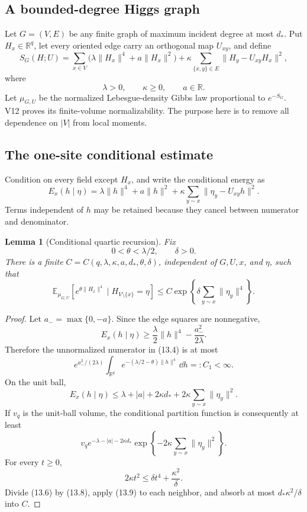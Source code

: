 \documentclass[11pt]{article}
\newtheorem{lemma}[theorem]{Lemma}
\theoremstyle{remark}
\begin{document}
\subsection{A bounded-degree Higgs graph}

Let \(G=(V,E)\) be any finite graph of maximum incident degree at
most \(d_*\).  Put \(H_x\in\mathbb R^q\), let every oriented edge
carry an orthogonal map \(U_{xy}\), and define
\[
 S_G(H;U)
 =\sum_{x\in V}\bigl(\lambda\|H_x\|^4+a\|H_x\|^2\bigr)
 +\kappa\sum_{\{x,y\}\in E}
 \|H_y-U_{xy}H_x\|^2,                             \tag{13.1}
\]
where
\[
 \lambda>0,\qquad \kappa\geq0,\qquad a\in\mathbb R. \tag{13.2}
\]
Let \(\mu_{G,U}\) be the normalized Lebesgue-density Gibbs law
proportional to \(e^{-S_G}\).  V12 proves its finite-volume
normalizability.  The purpose here is to remove all dependence on
\(|V|\) from local moments.

\subsection{The one-site conditional estimate}

Condition on every field except \(H_x\), and write the conditional
energy as
\[
 E_x(h\mid\eta)
 =\lambda\|h\|^4+a\|h\|^2
 +\kappa\sum_{y\sim x}\|\eta_y-U_{xy}h\|^2.        \tag{13.3}
\]
Terms independent of \(h\) may be retained because they cancel
between numerator and denominator.

\begin{lemma}[Conditional quartic recursion]
\label{lem:v17v13-conditional}
Fix
\[
 0<\theta<\lambda/2,\qquad \delta>0.
\]
There is a finite
\(C=C(q,\lambda,\kappa,a,d_*,\theta,\delta)\), independent of
\(G,U,x\), and \(\eta\), such that
\[
 \mathbb E_{\mu_{G,U}}
 \left[e^{\theta\|H_x\|^4}\mid H_{V\setminus\{x\}}=\eta\right]
 \leq
 C\exp\left\{\delta\sum_{y\sim x}\|\eta_y\|^4\right\}.             \tag{13.4}
\]
\end{lemma}

\begin{proof}
Let \(a_-=\max\{0,-a\}\).  Since the edge squares are nonnegative,
\[
 E_x(h\mid\eta)
 \geq\frac{\lambda}{2}\|h\|^4-\frac{a_-^2}{2\lambda}.             \tag{13.5}
\]
Therefore the unnormalized numerator in (13.4) is at most
\[
 e^{a_-^2/(2\lambda)}
 \int_{\mathbb R^q}
 e^{-(\lambda/2-\theta)\|h\|^4}\,\dd h
 =:C_1<\infty.                                      \tag{13.6}
\]
On the unit ball,
\[
 E_x(h\mid\eta)
 \leq
 \lambda+|a|+2\kappa d_*
 +2\kappa\sum_{y\sim x}\|\eta_y\|^2.                \tag{13.7}
\]
If \(v_q\) is the unit-ball volume, the conditional partition
function is consequently at least
\[
 v_qe^{-\lambda-|a|-2\kappa d_*}
 \exp\left\{-2\kappa\sum_{y\sim x}\|\eta_y\|^2\right\}.             \tag{13.8}
\]
For every \(t\geq0\),
\[
 2\kappa t^2\leq\delta t^4+\frac{\kappa^2}{\delta}.                \tag{13.9}
\]
Divide (13.6) by (13.8), apply (13.9) to each neighbor,
and absorb at most \(d_*\kappa^2/\delta\) into \(C\).
\end{proof}
\end{document}
